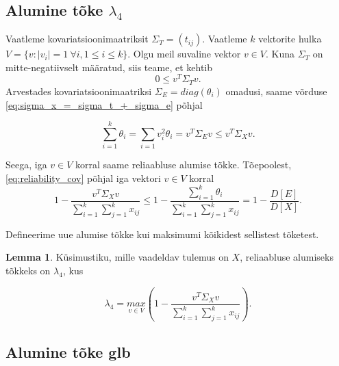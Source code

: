 \documentclass[a4paper,12pt,oneside]{article}
\newcounter{lemma}[section]
\numberwithin{equation}{section}
\theoremstyle{definition}
\newtheorem{lambda_4}[lemma]{Lemma}
\begin{document}
 

 
\subsection{Alumine tõke $\lambda_4$}

Vaatleme kovariatsioonimaatriksit $\Sigma_T=\left(t_{ij} \right)$. Vaatleme $k$ vektorite hulka $V = \lbrace v : \lvert {v_i} \rvert = 1 ~ \forall i, 1 \leq i \leq k \rbrace$.  Olgu meil suvaline vektor $v \in V$. Kuna $\Sigma_T$ on mitte-negatiivselt määratud, siis teame, et kehtib
\begin{equation*}
0 \leq v^{T} \Sigma_T v \text{.}
\end{equation*}
Arvestades kovariatsioonimaatriksi $\Sigma_E=diag(\theta_i)$ omadusi, saame võrduse \eqref{eq:sigma_x_=_sigma_t_+_sigma_e} põhjal 

\begin{equation*}
\sum \limits_{i=1}^k \theta_i = \sum \limits_{i=1} v_{i}^{2} \theta_i = v^{T} \Sigma_E v \leq v^{T} \Sigma_X v \text{.}
\end{equation*}

Seega, iga $v \in V$ korral saame reliaabluse alumise tõkke. Tõepoolest, \eqref{eq:reliability_cov} põhjal iga vektori $v \in V$ korral 
\begin{equation*}
1 - \frac{v^T \Sigma_X v}{\sum \limits_{i=1}^k \sum \limits_{j=1}^k x_{ij}} \leq 1 - \frac{\sum \limits_{i=1}^k \theta_i}{\sum \limits_{i=1}^k \sum \limits_{j=1}^k x_{ij}} = 1 - \frac{D \left[ E \right]}{ D \left[X \right]  } \text{.}
\end{equation*} 

Defineerime  uue alumise tõkke kui maksimumi kõikidest sellistest tõketest.

\vspace{10pt}

\begin{lambda_4}
Küsimustiku, mille vaadeldav tulemus on $X$, reliaabluse alumiseks tõkkeks on $\lambda_4$, kus 

\begin{equation*}
\lambda_4  = \underset{v \in V}{max} \left( 1 - \frac{v^{T} \Sigma_X v}{\sum \limits_{i=1}^k \sum \limits_{j=1}^k x_{ij}} \right)\text{.}
\end{equation*}
\end{lambda_4}


\subsection{Alumine tõke glb}
\end{document}
